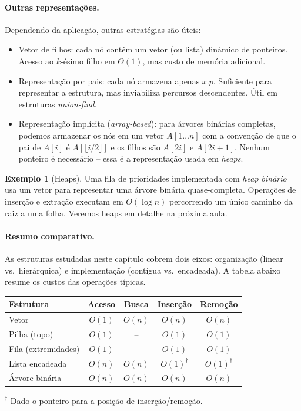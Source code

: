 \documentclass[9pt,a4paper]{extarticle}
\newcommand{\impt}[1]{\textcolor{important}{#1}}
\newcommand{\ntc}[1]{\textcolor{notice}{#1}}
\theoremstyle{definition}
\newtheorem{example}{Exemplo}[section]
\begin{document}
\paragraph{Outras representações.} Dependendo da aplicação, outras estratégias são úteis:
\begin{itemize}
    \item \impt{Vetor de filhos}: cada nó contém um vetor (ou lista) dinâmico de ponteiros. Acesso ao $k$-ésimo filho em $\Theta(1)$, mas custo de memória adicional.
    \item \impt{Representação por pais}: cada nó armazena apenas $x.p$. Suficiente para representar a estrutura, mas inviabiliza percursos descendentes. Útil em estruturas \emph{union-find}.
    \item \impt{Representação implícita} (\emph{array-based}): para árvores binárias completas, podemos armazenar os nós em um vetor $A[1 \ldots n]$ com a convenção de que o pai de $A[i]$ é $A[\lfloor i/2 \rfloor]$ e os filhos são $A[2i]$ e $A[2i+1]$. \ntc{Nenhum ponteiro é necessário} -- essa é a representação usada em \emph{heaps}.
\end{itemize}

\begin{example}[Heaps]
Uma fila de prioridades implementada com \emph{heap binário} usa um vetor para representar uma árvore binária quase-completa. Operações de inserção e extração executam em $O(\log n)$ percorrendo um único caminho da raiz a uma folha. Veremos heaps em detalhe na próxima aula.
\end{example}

\paragraph{Resumo comparativo.} As estruturas estudadas neste capítulo cobrem dois eixos: organização (linear vs.\ hierárquica) e implementação (contígua vs.\ encadeada). A tabela abaixo resume os custos das operações típicas.

\begin{center}
\begin{tabular}{lcccc}
\toprule
\textbf{Estrutura} & \textbf{Acesso} & \textbf{Busca} & \textbf{Inserção} & \textbf{Remoção} \\
\midrule
Vetor                & $O(1)$         & $O(n)$  & $O(n)$         & $O(n)$ \\
Pilha (topo)         & $O(1)$         & --      & $O(1)$         & $O(1)$ \\
Fila (extremidades)  & $O(1)$         & --      & $O(1)$         & $O(1)$ \\
Lista encadeada      & $O(n)$         & $O(n)$  & $O(1)^\dagger$ & $O(1)^\dagger$ \\
Árvore binária       & $O(n)$         & $O(n)$  & $O(n)$         & $O(n)$ \\
\bottomrule
\end{tabular}
\end{center}
$^\dagger$ Dado o ponteiro para a posição de inserção/remoção.
\end{document}
